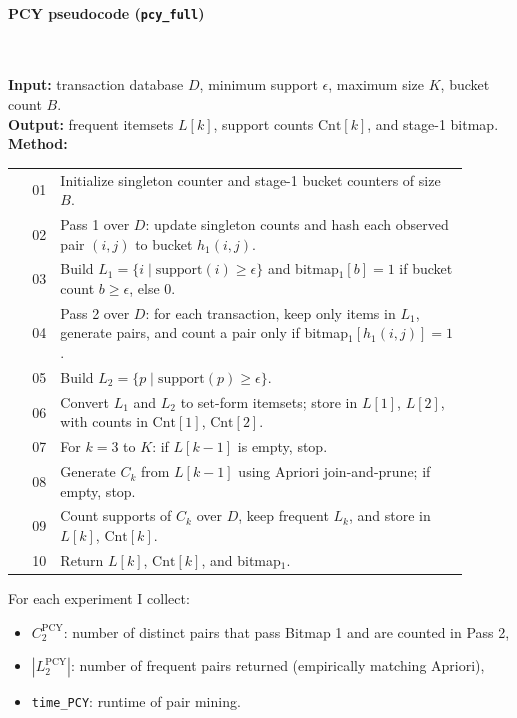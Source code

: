 \documentclass{article}  %
\begin{document}
\paragraph{PCY pseudocode (\texttt{pcy\_full})}\mbox{}\\
\begin{small}
\textbf{Input:} transaction database \(D\), minimum support \(\epsilon\), maximum size \(K\), bucket count \(B\).\\
\textbf{Output:} frequent itemsets \(L[k]\), support counts \(\mathrm{Cnt}[k]\), and stage-1 bitmap.\\
\textbf{Method:}
\begin{tabular}{@{}r p{0.90\linewidth}@{}}
01 & Initialize singleton counter and stage-1 bucket counters of size \(B\). \\
02 & Pass 1 over \(D\): update singleton counts and hash each observed pair \((i,j)\) to bucket \(h_1(i,j)\). \\
03 & Build \(L_1=\{i\mid \mathrm{support}(i)\ge \epsilon\}\) and bitmap\(_1[b]=1\) if bucket count \(b\ge \epsilon\), else \(0\). \\
04 & Pass 2 over \(D\): for each transaction, keep only items in \(L_1\), generate pairs, and count a pair only if bitmap\(_1[h_1(i,j)] = 1\). \\
05 & Build \(L_2=\{p\mid \mathrm{support}(p)\ge \epsilon\}\). \\
06 & Convert \(L_1\) and \(L_2\) to set-form itemsets; store in \(L[1]\), \(L[2]\), with counts in \(\mathrm{Cnt}[1]\), \(\mathrm{Cnt}[2]\). \\
07 & For \(k=3\) to \(K\): if \(L[k-1]\) is empty, stop. \\
08 & Generate \(C_k\) from \(L[k-1]\) using Apriori join-and-prune; if empty, stop. \\
09 & Count supports of \(C_k\) over \(D\), keep frequent \(L_k\), and store in \(L[k]\), \(\mathrm{Cnt}[k]\). \\
10 & Return \(L[k]\), \(\mathrm{Cnt}[k]\), and bitmap\(_1\). \\
\end{tabular}
\end{small}

For each experiment I collect:
\begin{itemize}
    \item \(C_2^{\text{PCY}}\): number of distinct pairs that pass Bitmap 1 and are counted in Pass 2,
    \item \(|L_2^{\text{PCY}}|\): number of frequent pairs returned (empirically matching Apriori),
    \item \verb|time_PCY|: runtime of pair mining.
\end{itemize}
\end{document}
